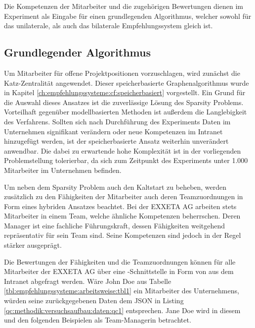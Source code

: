 Die Kompetenzen der Mitarbeiter und die zugehörigen Bewertungen dienen im Experiment als Eingabe für einen grundlegenden Algorithmus, welcher sowohl für das unilaterale, als auch das bilaterale Empfehlungssystem gleich ist.

\subsection{Grundlegender Algorithmus}
\label{ch:methodik:versuchsaufbau:grundlegend}
Um Mitarbeiter für offene Projektpositionen vorzuschlagen, wird zunächst die Katz-Zentralität angewendet. Dieser speicherbasierte Graphenalgorithmus wurde in Kapitel \ref{ch:empfehlungssysteme:cf:speicherbasiert} vorgestellt. Ein Grund für die Auswahl dieses Ansatzes ist die zuverlässige Lösung des Sparsity Problems. Vorteilhaft gegenüber modellbasierten Methoden ist außerdem die Langlebigkeit des Verfahrens. Sollten sich nach Durchführung des Experiments Daten im Unternehmen signifikant verändern oder neue Kompetenzen im Intranet hinzugefügt werden, ist der speicherbasierte Ansatz weiterhin unverändert anwendbar. Die dabei zu erwartende hohe Komplexität ist in der vorliegenden Problemstellung tolerierbar, da sich zum Zeitpunkt des Experiments unter 1.000 Mitarbeiter im Unternehmen befinden.

Um neben dem Sparsity Problem auch den Kaltstart zu beheben, werden zusätzlich zu den Fähigkeiten der Mitarbeiter auch deren Teamzuordnungen in Form eines hybriden Ansatzes beachtet. Bei der EXXETA AG arbeiten stets Mitarbeiter in einem Team, welche ähnliche Kompetenzen beherrschen. Deren Manager ist eine fachliche Führungskraft, dessen Fähigkeiten weitgehend repräsentativ für sein Team sind. Seine Kompetenzen sind jedoch in der Regel stärker ausgeprägt.

Die Bewertungen der Fähigkeiten und die Teamzuordnungen können für alle Mitarbeiter der EXXETA AG über eine -Schnittstelle in Form von  aus dem Intranet abgefragt werden. Wäre John Doe aus Tabelle \ref{tbl:empfehlungssysteme:arbeitsweise:tbl1} ein Mitarbeiter des Unternehmens, würden seine zurückgegebenen Daten dem \ac{JSON} in Listing \ref{qc:methodik:versuchsaufbau:daten:qc1} entsprechen. Jane Doe wird in diesem und den folgenden Beispielen als Team-Managerin betrachtet.



